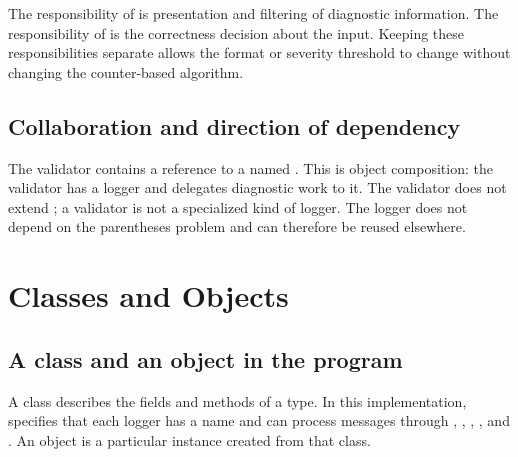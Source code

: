 The responsibility of  is presentation and filtering of diagnostic information. The responsibility of  is the correctness decision about the input. Keeping these responsibilities separate allows the format or severity threshold to change without changing the counter-based algorithm.

\subsection{Collaboration and direction of dependency}
\begin{center}
\end{center}
The validator contains a reference to a  named . This is object composition: the validator has a logger and delegates diagnostic work to it. The validator does not extend ; a validator is not a specialized kind of logger. The logger does not depend on the parentheses problem and can therefore be reused elsewhere.

\section{Classes and Objects}
\subsection{A class and an object in the program}
A class describes the fields and methods of a type. In this implementation,  specifies that each logger has a name and can process messages through , , , , and . An object is a particular instance created from that class.

